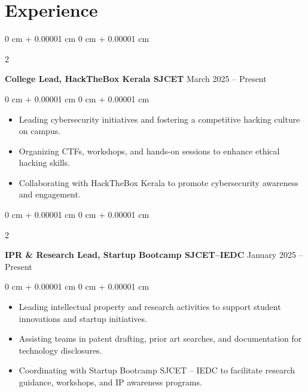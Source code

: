 \documentclass[10pt, letterpaper]{article}
\newenvironment{highlights}{
    \begin{itemize}[
        topsep=0.10 cm,
        parsep=0.10 cm,
        partopsep=0pt,
        itemsep=0pt,
        leftmargin=0 cm + 10pt
    ]
}{
    \end{itemize}
} %
\newenvironment{onecolentry}{
    \begin{adjustwidth}{
        0 cm + 0.00001 cm
    }{
        0 cm + 0.00001 cm
    }
}{
    \end{adjustwidth}
} %
\newenvironment{twocolentry}[2][]{
    \onecolentry
    \def\secondColumn{#2}
    \setcolumnwidth{\fill, 4.5 cm}
    \begin{paracol}{2}
}{
    \switchcolumn \raggedleft \secondColumn
    \end{paracol}
    \endonecolentry
} %
\begin{document}
    
    \section{Experience}

\begin{twocolentry}{
            March 2025 – Present
        }
            \textbf{College Lead, HackTheBox Kerala SJCET}\end{twocolentry}

        \vspace{0.10 cm}
        \begin{onecolentry}
            \begin{highlights}
                \item Leading cybersecurity initiatives and fostering a competitive hacking culture on campus.
                \item Organizing CTFs, workshops, and hands-on sessions to enhance ethical hacking skills.
                \item Collaborating with HackTheBox Kerala to promote cybersecurity awareness and engagement.
            \end{highlights}
        \end{onecolentry}

        \vspace{0.2 cm}

\begin{twocolentry}{
            January 2025 – Present
        }
            \textbf{IPR \& Research Lead, Startup Bootcamp SJCET–IEDC}\end{twocolentry}

        \vspace{0.10 cm}
        \begin{onecolentry}
            \begin{highlights}
                \item Leading intellectual property and research activities to support student innovations and startup initiatives.
                \item Assisting teams in patent drafting, prior art searches, and documentation for technology disclosures.
                \item Coordinating with Startup Bootcamp SJCET – IEDC to facilitate research guidance, workshops, and IP awareness programs.

            \end{highlights}
        \end{onecolentry}
\end{document}
